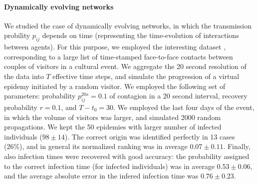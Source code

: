 \paragraph*{Dynamically evolving networks}
We studied the case of dynamically evolving networks, in which the transmission probility $p_{ij}$ depends on time (representing the time-evolution of interactions between agents). For this purpose, we employed the interesting dataset \cite{isella_whats_2011}, corresponding to a large list of time-stamped face-to-face contacts between couples of visitors in a cultural event. We aggregate the 20 second resolution of the data into $T$ effective time steps, and simulate the progression of a virtual epidemy initiated by a random visitor. We employed the following set of parameters: probability $p^{20s}_{ij}=0.1$ of contagion in a 20 second interval, recovery probability $r=0.1$, and $T-t_0=30$. We employed the last four days of the event, in which the volume of visitors was larger, and simulated 2000 random propagations. We kept the 50 epidemies with larger number of infected individuals ($98\pm 14$). The correct origin was identified perfectly in 13 cases (26\%), and in general its normalized ranking was in average $0.07\pm0.11$. Finally, also infection times were recovered with good accuracy: the probability assigned to the correct infection time (for infected individuals) was in average $0.53\pm 0.06$, and the average absolute error in the infered infection time was $0.76\pm 0.23$.



